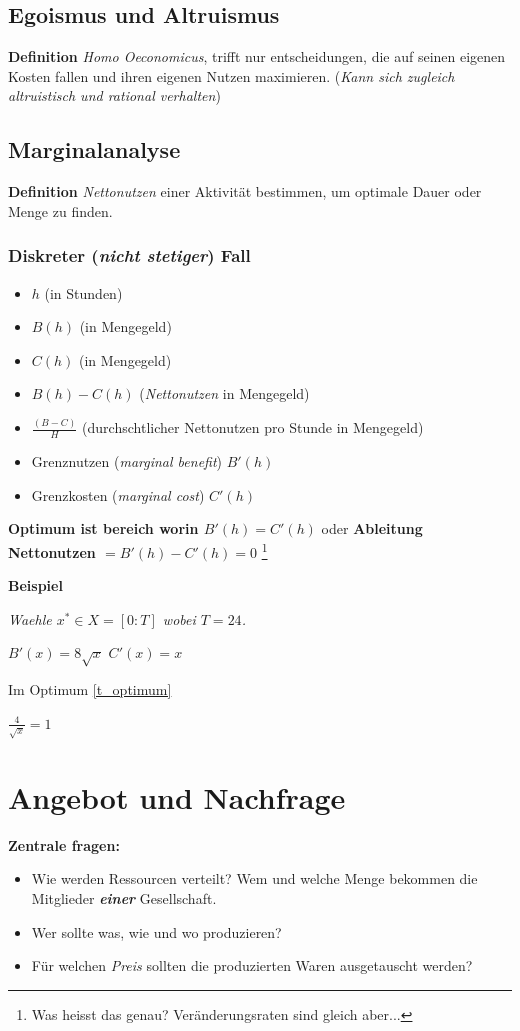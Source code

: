 \subsection{Egoismus und Altruismus}

\textbf{Definition} \textit{Homo Oeconomicus}, trifft nur entscheidungen, die auf seinen eigenen Kosten fallen und ihren eigenen Nutzen maximieren. (\textit{Kann sich zugleich altruistisch und rational verhalten})
\pagebreak

\subsection{Marginalanalyse}
\textbf{Definition} \textit{Nettonutzen} einer Aktivität bestimmen, um optimale Dauer oder Menge zu finden. 
\subsubsection{Diskreter (\textit{nicht stetiger}) Fall}
\begin{itemize}
    \item $h$ (in Stunden)
    \item $B(h)$ (in Mengegeld)
    \item $C(h)$ (in Mengegeld)
    \item $B(h) - C(h)$ (\textit{Nettonutzen} in Mengegeld) 
    \item $\frac{(B - C) }{H}$ (durchschtlicher Nettonutzen pro Stunde in Mengegeld)
    \item Grenznutzen  (\textit{marginal benefit}) $B'(h)$
    \item Grenzkosten (\textit{marginal cost}) $C'(h)$ 
\end{itemize}
\begin{theorem}
    \label{t_optimum}
    \textbf{Optimum ist bereich worin $B'(h) = C'(h)$} oder \textbf{Ableitung Nettonutzen $= B'(h) - C'(h) = 0$} \footnote{Was heisst das genau? Veränderungsraten sind gleich aber...}
\end{theorem}

\textbf{Beispiel}

\textit{Waehle $x^* \in X = [0 \colon T]$ wobei $T = 24$.}

\textit{$B'(x) = 8\sqrt{x}$}
\textit{$C'(x) = x$}

Im Optimum \ref{t_optimum}

$\frac{4}{\sqrt{x}}=1$ 

\section{Angebot und Nachfrage}
\textbf{Zentrale fragen:} 
\begin{itemize}
\item Wie werden Ressourcen verteilt? Wem und welche Menge bekommen die Mitglieder \textbf{\textit{einer}} Gesellschaft.
\item Wer sollte was, wie und wo produzieren?
\item Für welchen \textit{Preis} sollten die produzierten Waren ausgetauscht werden?
\end{itemize}

